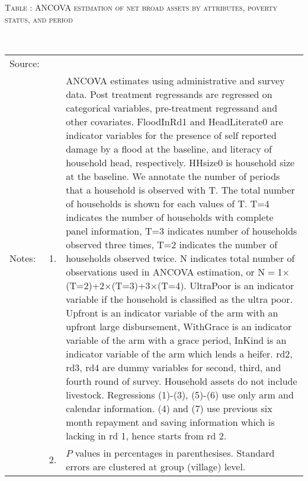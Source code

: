 \hspace{-1cm}\begin{minipage}[t]{14cm}
\hfil\textsc{\normalsize Table \thetable: ANCOVA estimation of net broad assets by attributes, poverty status, and period\label{tab ANCOVA net broad assets timevarying poverty status attributes}}\\
\setlength{\tabcolsep}{1pt}
\setlength{\baselineskip}{8pt}
\renewcommand{\arraystretch}{.55}
\hfil{}\\
\renewcommand{\arraystretch}{.8}
\setlength{\tabcolsep}{1pt}
\begin{tabular}{>{\hfill\scriptsize}p{1cm}<{}>{\hfill\scriptsize}p{.25cm}<{}>{\scriptsize}p{12cm}<{\hfill}}
Source:& \multicolumn{2}{l}{\scriptsize Estimated with GUK administrative and survey data.}\\
Notes: & 1. & ANCOVA estimates using administrative and survey data. Post treatment regressands are regressed on categorical variables, pre-treatment regressand and other covariates. \textsf{FloodInRd1} and \textsf{HeadLiterate0} are indicator variables for the presence of self reported damage by a flood at the baseline, and literacy of household head, respectively. \textsf{HHsize0} is household size at the baseline. We annotate the number of periods that a household is observed with \textsf{T}. The total number of households is shown for each values of \textsf{T}. \textsf{T=4} indicates the number of households with complete panel information, \textsf{T=3} indicates number of households observed three times, \textsf{T=2} indicates the number of households observed twice. \textsf{N} indicates total number of observations used in ANCOVA estimation, or \textsf{N$=$1$\times$(T=2)+2$\times$(T=3)+3$\times$(T=4)}.  \textsf{UltraPoor} is an indicator variable if the household is classified as the ultra poor. \textsf{Upfront} is an indicator variable of the arm with an upfront large disbursement, \textsf{WithGrace} is an indicator variable of the arm with a grace period, \textsf{InKind} is an indicator variable of the arm which lends a heifer. \textsf{rd2, rd3, rd4} are dummy variables for second, third, and fourth round of survey. Household assets do not include livestock. Regressions (1)-(3), (5)-(6) use only arm and calendar information. (4) and (7) use previous six month repayment and saving information which is lacking in rd 1, hence starts from rd 2.\\
& 2. & $P$ values in percentages in parenthesises. Standard errors are clustered at group (village) level.
\end{tabular}
\end{minipage}

